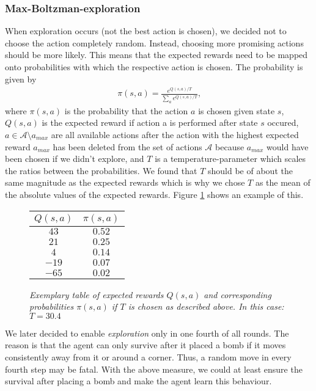 	\subsubsection{Max-Boltzman-exploration}
	When exploration occurs (not the best action is chosen), we decided not to choose the action completely random. Instead, choosing more promising actions should be more likely. This means that the expected rewards need to be mapped onto probabilities with which the respective action is chosen. The probability is given by 
	\begin{align}
		\pi (s,a) = \frac{e^{Q(s,a)/T}}{\sum_{a} e^{Q(s,a)/T}}\text{,}
	\end{align}
	where $\pi (s,a)$ is the probability that the action $a$ is chosen given state $s$, $Q(s,a)$ is the expected reward if action a is performed after state $s$ occured, $a \in \mathcal{A}\setminus a_{max}$ are all available actions after the action with the highest expected reward $a_{max}$ has been deleted from the set of actions $\mathcal{A}$ because $a_{max}$ would have been chosen if we didn't explore, and $T$ is a temperature-parameter which scales the ratios between the probabilities. We found that $T$ should be of about the same magnitude as the expected rewards which is why we chose $T$ as the mean of the absolute values of the expected rewards. Figure \ref{MB_table} shows an example of this.
	\begin{figure}[h]
		\centering
		\begin{tabular}{c|c}
			$Q(s,a)$ & $\pi (s,a)$\\
			\midrule
			$43$ & $0.52$\\
			$21$ & $0.25$\\
			$4$ & $0.14$\\
			$-19$ & $0.07$\\
			$-65$ & $0.02$
		\end{tabular}
	\caption{\textit{Exemplary table of expected rewards $Q(s,a)$ and corresponding probabilities $\pi (s,a)$ if $T$ is chosen as described above. In this case: $T=30.4$}}
	\label{MB_table}
	\end{figure}
	We later decided to enable \textit{exploration} only in one fourth of all rounds. The reason is that the agent can only survive after it placed a bomb if it moves consistently away from it or around a corner. Thus, a random move in every fourth step may be fatal. With the above measure, we could at least ensure the survival after placing a bomb and make the agent learn this behaviour.
	
